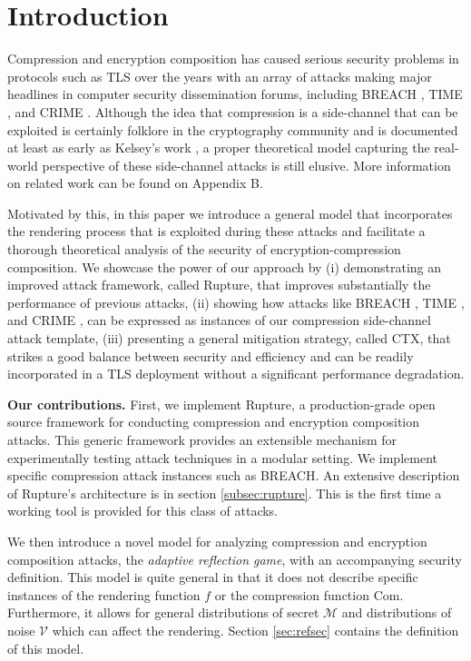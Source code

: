 \section{Introduction}\label{sec:prev}

Compression and encryption composition has caused serious security problems in
protocols such as TLS \cite{dierks2008tls} over the years with an array of
attacks making major headlines in computer security dissemination forums,
including BREACH \cite{gluck2013breach}, TIME \cite{be2013perfect}, and CRIME
\cite{duong2012crime}. Although the idea that compression is a side-channel that
can be exploited is certainly folklore in the cryptography community and is
documented at least as early as Kelsey's work \cite{kelsey2002compression}, a
proper theoretical model capturing the real-world perspective of these
side-channel attacks is still elusive. More information on related work can be
found on Appendix B.

Motivated by this, in this paper we introduce a general model that incorporates
the rendering process that is exploited during these attacks and facilitate a
thorough theoretical analysis of the security of encryption-compression
composition. We showcase the power of our approach by (i) demonstrating an
improved attack framework, called Rupture, that improves substantially the
performance of previous attacks, (ii) showing how attacks like BREACH
\cite{gluck2013breach}, TIME \cite{be2013perfect}, and CRIME
\cite{duong2012crime}, can be expressed as instances of our compression
side-channel attack template, (iii) presenting a general mitigation strategy,
called CTX, that strikes a good balance between security and efficiency and can
be readily incorporated in a TLS deployment without a significant performance
degradation.

\noindent
\textbf{Our contributions.} First, we implement Rupture\footnotemark[1], a
production-grade open source framework for conducting compression and encryption
composition attacks. This generic framework provides an extensible mechanism
for experimentally testing attack techniques in a modular setting. We implement
specific compression attack instances such as BREACH. An extensive
description of Rupture's architecture is in section \ref{subsec:rupture}.
This is the first time a working tool is provided for this class of attacks.

We then introduce a novel model for analyzing compression and encryption
composition attacks, the \textit{adaptive reflection game}, with an accompanying
security definition. This model is quite general in that it does not describe
specific instances of the rendering function $f$ or the compression function
$\textrm{Com}$. Furthermore, it allows for general distributions of secret
$\mathcal{M}$ and distributions of noise $\mathcal{V}$ which can affect the
rendering. Section \ref{sec:refsec} contains the definition of this model.

